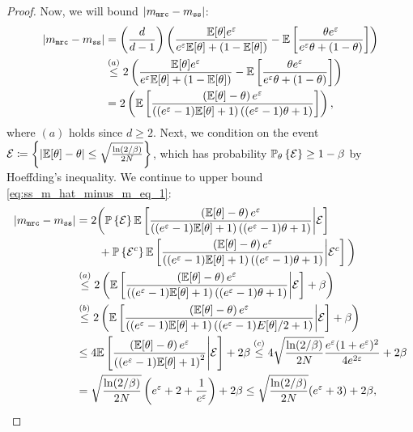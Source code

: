 \begin{proof}
Now, we will bound $\left\lvert m_{\texttt{mrc}} - m_{\texttt{ss}} \right\rvert$:
\begin{align}
    \left\lvert m_{\texttt{mrc}} - m_{\texttt{ss}} \right\rvert 
    & = \left(\frac{d}{d-1}\right)\left( \frac{\mathbb{E}[\theta]e^\varepsilon}{e^\varepsilon \mathbb{E}[\theta]+(1-\mathbb{E}[\theta])} - \mathbb{E}\left[ \frac{\theta e^\varepsilon}{e^\varepsilon \theta+(1-\theta)} \right]\right) \\
    &\stackrel{(a)}{\leq} 2 \left( \frac{\mathbb{E}[\theta]e^\varepsilon}{e^\varepsilon \mathbb{E}[\theta]+(1-\mathbb{E}[\theta])} - \mathbb{E}\left[ \frac{\theta e^\varepsilon}{e^\varepsilon \theta+(1-\theta)} \right]\right) \\
    & = 2 \left( \mathbb{E}\left[ \frac{\left( \mathbb{E}[\theta]-\theta\right) e^\varepsilon}{\left((e^\varepsilon-1) \mathbb{E}[\theta]+1\right)\left((e^\varepsilon-1) \theta+1\right)} \right]\right)\label{eq:ss_m_hat_minus_m_eq_1},
\end{align}
where $(a)$ holds since $d\geq 2$.
Next, we condition on the event $\mathcal{E} \coloneqq \left\{ \left\lvert \mathbb{E}[\theta]-\theta\right\rvert \leq \sqrt{\frac{\ln(2/\beta)}{2N}} \right\}$, which has probability $\mathbb{P}_\theta\left\{ \mathcal{E} \right\} \geq 1-\beta$ by Hoeffding's inequality. We continue to upper bound \eqref{eq:ss_m_hat_minus_m_eq_1}:
\begin{align}
\lba m_{\texttt{mrc}}    -    m_{\texttt{ss}} \rba 
&= 2 \bigg( \Pr\lbp \mcal{E} \rbp\E\lb \frac{\lp  \E[\theta]-\theta\rp e^\varepsilon}{\lp(e^\varepsilon    -    1) \E[\theta]    +    1\rp\lp(e^\varepsilon    -    1) \theta    +    1\rp} \mv \mcal{E} \rb    \\
& \qquad +    \Pr\lbp \mcal{E}^c \rbp\E\lb \frac{\lp  \E[\theta]-\theta\rp e^\varepsilon}{\lp(e^\varepsilon    -    1) \E[\theta]   +    1\rp\lp(e^\varepsilon    -    1) \theta    +    1\rp} \mv \mcal{E}^c \rb \bigg)\\
& \stackrel{(a)}{\leq} 2 \lp \E\lb \frac{\lp  \E[\theta]-\theta\rp e^\varepsilon}{\lp(e^\varepsilon-1) \E[\theta]+1\rp\lp(e^\varepsilon-1) \theta+1\rp} \mv \mcal{E} \rb +\beta \rp\\
& \stackrel{(b)}{\leq} 2 \lp \E\lb \frac{\lp  \E[\theta]-\theta\rp e^\varepsilon}{\lp(e^\varepsilon-1) \E[\theta]+1\rp\lp(e^\varepsilon-1) E[\theta]/2+1\rp} \mv \mcal{E} \rb +\beta \rp\\
    & \leq 4\E\lb \frac{\lp \E[\theta] - \theta \rp e^\varepsilon}{\lp(e^\varepsilon-1) \E[\theta]+1\rp^2} \mv \mcal{E} \rb + 2\beta \stackrel{(c)}{\leq} 4\sqrt{\frac{\ln(2/\beta)}{2N}} \frac{e^\varepsilon(1+e^\varepsilon)^2}{4e^{2\varepsilon}}+ 2\beta \\
    & = \sqrt{\frac{\ln(2/\beta)}{2N}}\lp e^\varepsilon+2+\frac{1}{e^\varepsilon} \rp + 2\beta \leq \sqrt{\frac{\ln(2/\beta)}{2N}}(e^\varepsilon+3)+2\beta, \label{eq:mrc_ss_nrel1}

\end{align}
\end{proof}

